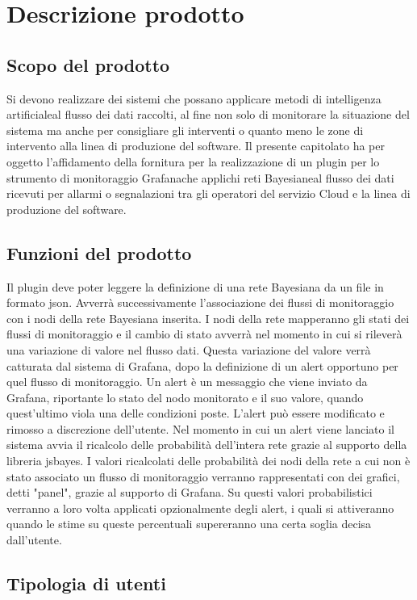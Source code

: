 \section{Descrizione prodotto}
		\subsection{Scopo del prodotto}			
Si devono realizzare dei sistemi che possano applicare metodi di intelligenza artificiale\pedice al flusso dei dati raccolti, al fine non solo di monitorare la situazione del sistema ma anche per consigliare gli interventi o quanto meno le zone di intervento alla linea di produzione del software.
Il presente capitolato ha per oggetto l'affidamento della fornitura per la
realizzazione di un plugin per lo strumento di monitoraggio Grafana\pedice che
applichi reti Bayesiane\pedice al flusso dei dati ricevuti per allarmi o segnalazioni tra gli operatori del servizio Cloud e la linea di produzione del software.


		\subsection{Funzioni del prodotto}
Il plugin deve poter leggere la definizione di una rete Bayesiana da un file in formato json. Avverrà successivamente l'associazione dei flussi di monitoraggio con i nodi della rete Bayesiana inserita. I nodi della rete mapperanno gli stati dei flussi di monitoraggio e il cambio di stato avverrà nel momento in cui si rileverà una variazione di valore nel flusso dati. Questa variazione del valore verrà catturata dal sistema di Grafana, dopo la definizione di un alert opportuno per quel flusso di monitoraggio. Un alert è un messaggio che viene inviato da Grafana, riportante lo stato del nodo monitorato e il suo valore, quando quest'ultimo viola una delle condizioni poste. L'alert può essere modificato e rimosso a discrezione dell'utente.
Nel momento in cui un alert viene lanciato il sistema avvia il ricalcolo delle probabilità dell'intera rete grazie al supporto della libreria jsbayes. 
I valori ricalcolati delle probabilità dei nodi della rete a cui non è stato associato un flusso di monitoraggio verranno rappresentati con dei grafici, detti "panel", grazie al supporto di Grafana.
Su questi valori probabilistici verranno a loro volta applicati opzionalmente degli alert, i quali si attiveranno quando le stime su queste percentuali supereranno una certa soglia decisa dall'utente.


		\subsection{Tipologia di utenti}

